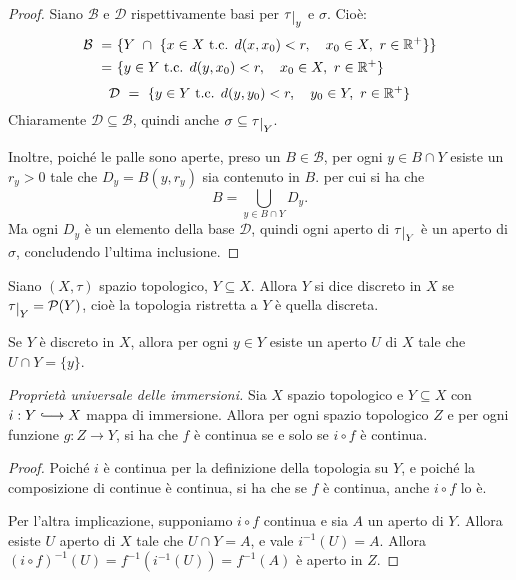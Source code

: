 \begin{proof}
    Siano $\mathcal{B}$ e $\mathcal{D}$ rispettivamente basi per
    $\tau\restrict{y}$ e $\sigma$. Cio\`e:
    \begin{align*}
        \mathcal{B}\ =&\ \{Y\ \cap\ \{x \in X \text{ t.c. } d(x, x_0) < r,\quad x_0 \in
        X,\ r \in \mathbb{R}^+\}\}\\
        =&\ \{y \in Y \text{ t.c. } d(y, x_0) < r,\quad x_0 \in X,\ r \in \mathbb{R}^+\}
    \end{align*}
    \[
        \mathcal{D}\ =\ \{y \in Y \text{ t.c. } d(y, y_0) < r,\quad y_0 \in Y,\ r \in
        \mathbb{R}^+\}
    \]
    Chiaramente $\mathcal{D} \subseteq \mathcal{B}$, quindi anche $\sigma
    \subseteq \tau\restrict{Y}$.

    Inoltre, poiché le palle sono aperte, preso un $B \in \mathcal{B}$, per ogni
    $y \in B \cap Y$ esiste un $r_y>0$ tale che $D_y = B(y,r_y)$ sia contenuto
    in $B$. per cui si ha che
    \[
        B = \bigcup_{y \in B \cap Y} D_y.
    \]
    Ma ogni $D_y$ \`e un elemento della base $\mathcal{D}$, quindi ogni aperto
    di $\tau\restrict{Y}$ \`e un aperto di $\sigma$, concludendo l'ultima
    inclusione.
\end{proof}

\begin{defn}
    Siano $(X, \tau)$ spazio topologico, $Y \subseteq X$. Allora $Y$ si dice
    discreto in $X$ se $\tau\restrict{Y} = \mathcal{P}(Y)$, cioè la topologia
    ristretta a $Y$ \`e quella discreta.
\end{defn}

\begin{oss}
    Se $Y$ \`e discreto in $X$, allora per ogni $y \in Y$ esiste un aperto $U$
    di $X$ tale che $U \cap Y = \{y\}$.
\end{oss}

\begin{thm}
    \emph{Proprietà universale delle immersioni.} Sia $X$ spazio topologico e $Y
    \subseteq X$ con $i: Y \hooklongrightarrow X$ mappa di immersione. Allora
    per ogni spazio topologico $Z$ e per ogni funzione $g: Z \longrightarrow Y$,
    si ha che $f$ \`e continua se e solo se $i \circ f$ \`e continua.
\end{thm}

\begin{proof}
    Poiché $i$ \`e continua per la definizione della topologia su $Y$, e poiché
    la composizione di continue \`e continua, si ha che se $f$ \`e continua,
    anche $i \circ f$ lo \`e.

    Per l'altra implicazione, supponiamo $i \circ f$ continua e sia $A$ un
    aperto di $Y$. Allora esiste $U$ aperto di $X$ tale che ${U\cap Y = A}$, e
    vale ${i^{-1}(U) = A}$. Allora $(i\circ f)^{-1}(U) = f^{-1}(i^{-1}(U)) =
    f^{-1}(A)$ \`e aperto in $Z$.
\end{proof}


